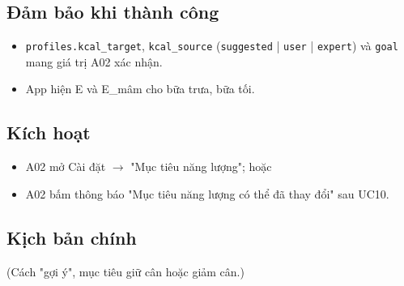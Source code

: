 \subsection{Đảm bảo khi thành công}
\begin{itemize}
\item {\small\texttt{profiles.\allowbreak{}kcal\_\allowbreak{}\allowbreak{}target}}, {\small\texttt{kcal\_\allowbreak{}\allowbreak{}source}} ({\small\texttt{suggested}} |\allowbreak{} {\small\texttt{user}} |\allowbreak{} {\small\texttt{expert}}) và {\small\texttt{goal}} mang giá trị A02 xác nhận.
\item App hiện E và E\_\allowbreak{}mâm cho bữa trưa, bữa tối.
\end{itemize}
\subsection{Kích hoạt}
\begin{itemize}
\item A02 mở Cài đặt \ensuremath{\rightarrow} "Mục tiêu năng lượng"; hoặc
\item A02 bấm thông báo "Mục tiêu năng lượng có thể đã thay đổi" sau UC10.
\end{itemize}
\subsection{Kịch bản chính}
(Cách "gợi ý", mục tiêu giữ cân hoặc giảm cân.)


